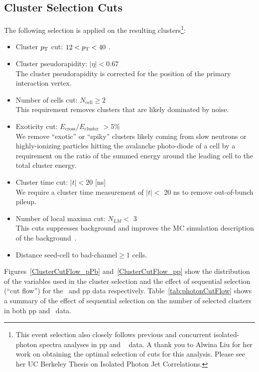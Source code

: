 \subsection{Cluster Selection Cuts}
The following selection is applied on the resulting clusters\footnote{This event selection also closely follows previous and concurrent isolated-photon spectra analyses in pp and \pPb~ data. A thank you to Alwina Liu for her work on obtaining the optimal selection of cuts for this analysis. Please see her UC Berkeley Thesis on Isolated Photon Jet Correlations.}:

\begin{itemize}
\item Cluster $p_{\mathrm{T}}$ cut:  $12< p_{\mathrm{T}} < 40$ \GeVc.
\item Cluster pseudorapidity: $|\eta| <0.67$\\
The cluster pseudorapidity is corrected for the position of the primary interaction vertex. 
\item Number of cells cut: $N_{\mathrm{cell}}\geq2$\\
This requirement removes clusters that are likely dominated by noise. 
\item Exoticity cut: $E_{\mathrm{cross}}/E_{\mathrm{cluster}}$ $> 5\%$\\
We remove ``exotic'' or ``spiky'' clusters likely coming from slow neutrons or highly-ionizing particles hitting the avalanche photo-diode of a cell by a requirement on the ratio of the summed energy around the leading cell to the total cluster energy.
\item Cluster time cut:  $|t|<20$ [ns]\\
We require a cluster time measurement of $|t|<$ 20 ns to remove out-of-bunch pileup. 
\item Number of local maxima cut: $N_{LM}<$ 3\\
This cuts suppresses background and improves the MC simulation description of the background~\cite{Acharya:2019jkx}.  
\item Distance seed-cell to bad-channel$\geq 1$ cells.
\end{itemize}

Figures~\ref{ClusterCutFlow_pPb} and~\ref{ClusterCutFlow_pp} show the distribution of the variables used in the cluster selection and the effect of sequential selection (``cut flow'') for the \pPb~and pp data respectively. Table~\ref{tab:photonCutFlow} shows a summary of the effect of sequential selection on the number of selected clusters in both pp and \pPb~data. 

